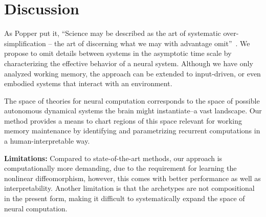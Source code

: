 \documentclass{article}
\theoremstyle{definition} \newtheorem{definition}{Definition}  \newtheorem{example}{Example}
\theoremstyle{remark} \newtheorem{remark}{Remark}
\newcounter{ct}
\begin{document}





\section{Discussion}
As Popper put it, ``Science may be described as the art of systematic over-simplification -- the art of discerning what we may with advantage omit''~\citep{Popper1988}.
We propose to omit details between systems in the asymptotic time scale by characterizing the effective behavior of a neural system.
Although we have only analyzed working memory, the approach can be extended to input-driven, or even embodied systems that interact with an environment.

The space of theories for neural computation corresponds to the space of possible autonomous dynamical systems the brain might instantiate--a vast landscape.
Our method provides a means to chart regions of this space relevant for working memory maintenance by identifying and parametrizing recurrent computations in a human-interpretable way.

\textbf{Limitations:}
Compared to state-of-the-art methods, our approach is computationally more demanding, due to the requirement for learning the nonlinear diffeomorphism, however, this comes with better performance as well as interpretability.
Another limitation is that the archetypes are not compositional in the present form, making it difficult to systematically expand the space of neural computation.
\end{document}
